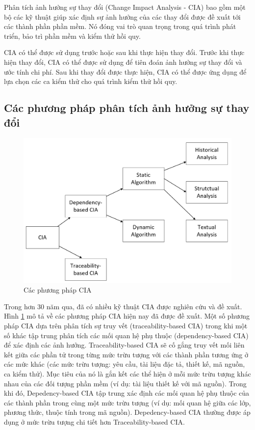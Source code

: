 \documentclass[12pt]{report}
\begin{document}
Phân tích ảnh hưởng sự thay đổi (Change Impact Analysis - CIA) bao gồm một bộ các kỹ thuật giúp xác định sự ảnh hưởng của các thay đổi được đề xuất tới các thành phần phần mềm\cite{cia-survey}. Nó đóng vai trò quan trọng trong quá trình phát triển, bảo trì phần mềm và kiểm thử hồi quy.

CIA có thể được sử dụng trước hoặc sau khi thực hiện thay đổi. Trước khi thực hiện thay đổi, CIA có thể được sử dụng để tiên đoán ảnh hưởng sự thay đổi và ước tính chi phí. Sau khi thay đổi được thực hiện, CIA có thể được ứng dụng để lựa chọn các ca kiểm thử cho quá trình kiểm thử hồi quy.

\subsection{Các phương pháp phân tích ảnh hưởng sự thay đổi}
\begin{figure}[h]
	\centering
	\includegraphics[scale=0.5]{CIA-hierarchy}
	\caption{Các phương pháp CIA}
	\label{fig:cia-hierarchy}
\end{figure}

Trong hơn 30 năm qua, đã có nhiều kỹ thuật CIA được nghiên cứu và đề xuất. Hình \ref{fig:cia-hierarchy} mô tả về các phương pháp CIA hiện nay đã được đề xuất. Một số phương pháp CIA dựa trên phân tích sự truy vết (traceability-based CIA) trong khi một số khác tập trung phân tích các mối quan hệ phụ thuộc (dependency-based CIA) để xác định các ảnh hưởng\cite{cia-bohner}. Traceability-based CIA sẽ cố gắng truy vết mối liên kết giữa các phần tử trong từng mức trừu tượng với các thành phần tương ứng ở các mức khác (các mức trừu tượng: yêu cầu, tài liệu đặc tả, thiết kế, mã nguồn, ca kiểm thử). Mục tiêu của nó là gắn kết các thể hiện ở mỗi mức trừu tượng khác nhau của các đối tượng phần mềm (ví dụ: tài liệu thiết kế với mã nguồn). Trong khi đó, Depedency-based CIA tập trung xác định các mối quan hệ phụ thuộc của các thành phần trong cùng một mức trừu tượng (ví dụ: mối quan hệ giữa các lớp, phương thức, thuộc tính trong mã nguồn). Depedency-based CIA thường được áp dụng ở mức trừu tượng chi tiết hơn Traceability-based CIA.
\end{document}
